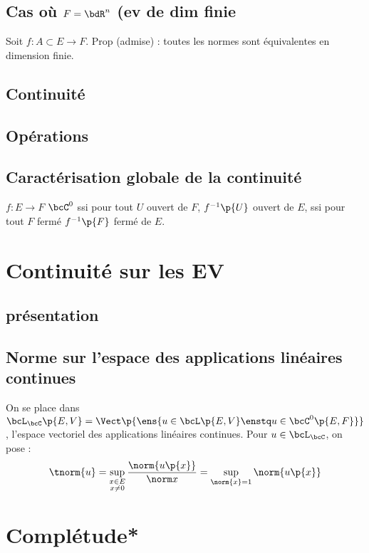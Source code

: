 \documentclass[a4paper,french,bookmarks]{book}
\begin{document}
    \subsection{Cas où $F = \bdR^n$ (ev de dim finie}
    Soit $f : A \subset E \to F$. Prop (admise) : toutes les normes sont équivalentes en dimension finie.
    
    \subsection{Continuité}
    \subsection{Opérations}
     
    \subsection{Caractérisation globale de la continuité}
     
    $f : E \to F$ $\bcC^0$ ssi pour tout $U$ ouvert de $F$, $f^{-1}\p{U}$ ouvert de $E$, ssi pour tout $F$ fermé $f^{-1}\p{F}$ fermé de $E$.
    
    
    \section{Continuité sur les EV}
    
    \subsection{présentation}
    
    \subsection{Norme sur l'espace des applications linéaires continues}
    
    On se place dans $\bcL_\bcC\p{E, V} = \Vect\p{\ens{u \in \bcL\p{E, V} \enstq u \in \bcC^0\p{E, F}}}$, l'espace vectoriel des applications linéaires continues. Pour $u \in \bcL_\bcC$, on pose :
    \[ \tnorm{u} = \sup\limits_{\substack{x \in E\\ x \neq 0}} \dfrac{\norm{u\p{x}}}{\norm x} = \sup\limits_{\norm{x} = 1} \norm{u\p{x}}\]

    \section{Complétude*}
    
\end{document}
